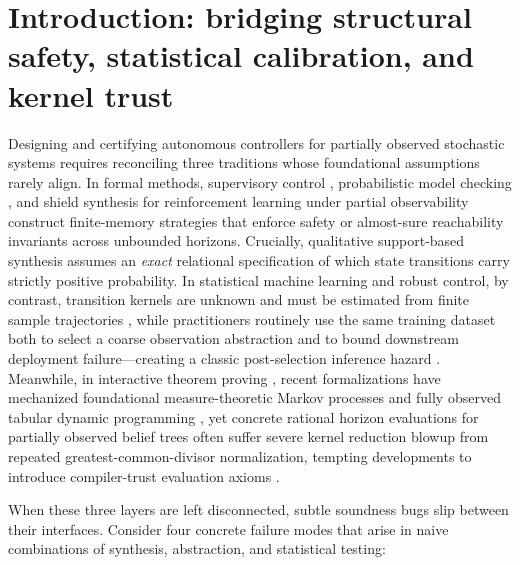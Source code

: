 \documentclass[11pt,a4paper]{article}
\begin{document}
\section{Introduction: bridging structural safety, statistical
calibration, and kernel
trust}\label{introduction-bridging-structural-safety-statistical-calibration-and-kernel-trust}

Designing and certifying autonomous controllers for partially observed
stochastic systems requires reconciling three traditions whose
foundational assumptions rarely align. In formal methods, supervisory
control \citep{ramadgeWonham1987, tabuada2009, cassandrasLafortune2021},
probabilistic model checking
\citep{baierKatoen2008, kwiatkowska2011, dehnert2017}, and shield
synthesis for reinforcement learning under partial observability
\citep{chatterjee2016, alshiekh2018, junges2021, carr2023} construct
finite-memory strategies that enforce safety or almost-sure reachability
invariants across unbounded horizons. Crucially, qualitative
support-based synthesis assumes an \emph{exact} relational specification
of which state transitions carry strictly positive probability. In
statistical machine learning and robust control, by contrast, transition
kernels are unknown and must be estimated from finite sample
trajectories
\citep{kearnsSingh2002, strehl2009, nilimElGhaoui2005, wiesemann2013},
while practitioners routinely use the same training dataset both to
select a coarse observation abstraction
\citep{ravindranBarto2004, ferns2004} and to bound downstream deployment
failure---creating a classic post-selection inference hazard
\citep{berk2013, mayo2018}. Meanwhile, in interactive theorem proving
\citep{nipkowPaulsonWenzel2002, bertotCasteran2004, mouraUllrich2021},
recent formalizations have mechanized foundational measure-theoretic
Markov processes and fully observed tabular dynamic programming
\citep{hoelzl2017, vajjha2021, schaeffelerAbdulaziz2023}, yet concrete
rational horizon evaluations for partially observed belief trees often
suffer severe kernel reduction blowup from repeated
greatest-common-divisor normalization, tempting developments to
introduce compiler-trust evaluation axioms \citep{boespflug2011}.

When these three layers are left disconnected, subtle soundness bugs
slip between their interfaces. Consider four concrete failure modes that
arise in naive combinations of synthesis, abstraction, and statistical
testing:
\end{document}

